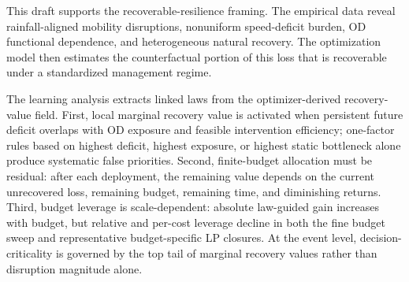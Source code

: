 This draft supports the recoverable-resilience framing. The empirical data reveal rainfall-aligned mobility disruptions, nonuniform speed-deficit burden, OD functional dependence, and heterogeneous natural recovery. The optimization model then estimates the counterfactual portion of this loss that is recoverable under a standardized management regime.

The learning analysis extracts linked laws from the optimizer-derived recovery-value field. First, local marginal recovery value is activated when persistent future deficit overlaps with OD exposure and feasible intervention efficiency; one-factor rules based on highest deficit, highest exposure, or highest static bottleneck alone produce systematic false priorities. Second, finite-budget allocation must be residual: after each deployment, the remaining value depends on the current unrecovered loss, remaining budget, remaining time, and diminishing returns. Third, budget leverage is scale-dependent: absolute law-guided gain increases with budget, but relative and per-cost leverage decline in both the fine budget sweep and representative budget-specific LP closures. At the event level, decision-criticality is governed by the top tail of marginal recovery values rather than disruption magnitude alone.

